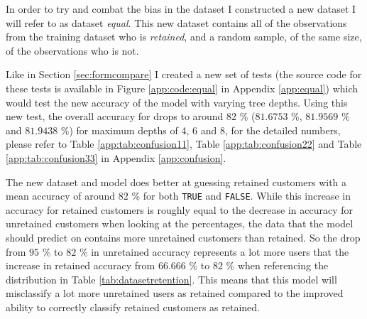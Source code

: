 In order to try and combat the bias in the dataset I constructed a new dataset I
will refer to as dataset \textit{equal}. This new dataset contains all of the
observations from the training dataset who is \textit{retained}, and a random
sample, of the same size, of the observations who is not.

Like in Section \ref{sec:formcompare} I created a new set of tests (the source
code for these tests is available in Figure \ref{app:code:equal} in Appendix
\ref{app:equal}) which would test the new accuracy of the model with varying
tree depths. Using this new test, the overall accuracy for drops to around $82$
\% ($81.6753$ \%, $81.9569$ \% and $81.9438$ \%) for maximum depths of 4, 6 and
8, for the detailed numbers, please refer to Table \ref{app:tab:confusion11},
Table \ref{app:tab:confusion22} and Table \ref{app:tab:confusion33} in Appendix
\ref{app:confusion}.

The new dataset and model does better at guessing retained customers with a mean
accuracy of around $82$ \% for both \texttt{TRUE} and \texttt{FALSE}. While this
increase in accuracy for retained customers is roughly equal to the decrease in
accuracy for unretained customers when looking at the percentages, the data that
the model should predict on contains more unretained customers than retained. So
the drop from $95$ \% to  $82$ \% in unretained accuracy represents a lot more
users that the increase in retained accuracy from  $66.666$ \% to  $82$ \% when
referencing the distribution in Table \ref{tab:datasetretention}. This means
that this model will misclassify a lot more unretained users as retained
compared to the improved ability to correctly classify retained customers as
retained.
